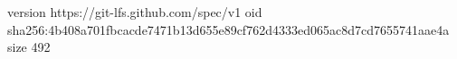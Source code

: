 version https://git-lfs.github.com/spec/v1
oid sha256:4b408a701fbcacde7471b13d655e89cf762d4333ed065ac8d7cd7655741aae4a
size 492
